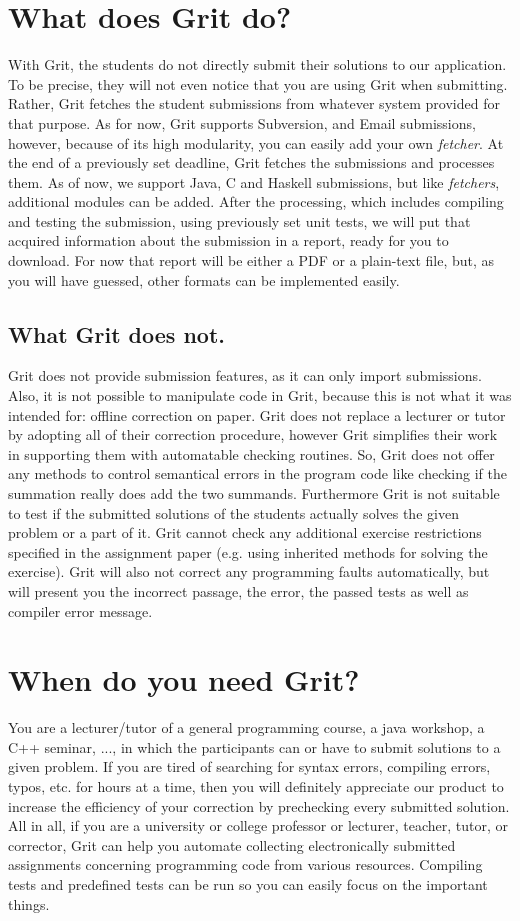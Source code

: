 \documentclass[10pt,a4paper, titlepage, toc=idx]{scrreprt}
\theoremstyle{definition}
\theoremstyle{plain}
\newcommand*{\product}{Grit}
\begin{document}
\section{What does \product{} do?}
With \product, the students do not directly submit their solutions to
our application. To be precise, they will not even notice that you are
using \product{} when submitting. Rather, \product{} fetches the student
submissions from whatever system provided for that purpose. As for
now, \product{} supports Subversion, and Email submissions,
however, because of its high modularity, you can easily add your own
{\it fetcher}. At the end of a previously set deadline,
\product{} fetches the submissions and processes them. As of now, we
support Java, C and Haskell submissions, but like {\it fetchers},
additional modules can be added. After the processing, which includes
compiling and testing the submission, using previously set unit tests,
we will put that acquired information about the submission in a
report, ready for you to download. For now that report will be either
a PDF or a plain-text file, but, as you will have guessed, other
formats can be implemented easily.
\subsection*{What \product{} does not.}
\product{} does not provide submission features, as it can only import
submissions. Also, it is not possible to manipulate code in \product,
because this is not what it was intended for: offline correction on
paper.  \product{} does not replace a lecturer or tutor by adopting all
of their correction procedure, however \product{} simplifies their work
in supporting them with automatable checking routines. So,
\product{} does not offer any methods to control semantical errors in
the program code like checking if the summation really does add the
two summands.  Furthermore \product{} is not suitable to test if the
submitted solutions of the students actually solves the given problem or
a part of it. \product{} cannot check any additional exercise
restrictions specified in the assignment paper (e.g. using inherited
methods for solving the exercise). \product{} will also not correct any
programming faults automatically, but will present you the incorrect
passage, the error, the passed tests as well as compiler
error message.
\section{When do you need \product?}
You are a lecturer/tutor of a general programming course, a java
workshop, a C++ seminar, ..., in which the participants can or have to
submit solutions to a given problem. If you are tired of searching for
syntax errors, compiling errors, typos, etc. for hours at a time, then
you will definitely appreciate our product to increase the efficiency
of your correction by prechecking every submitted solution. All in
all, if you are a university or college professor or lecturer,
teacher, tutor, or corrector, \product{} can help you automate
collecting electronically submitted assignments concerning programming
code from various resources. Compiling tests and predefined tests can
be run so you can easily focus on the important things.
\end{document}
